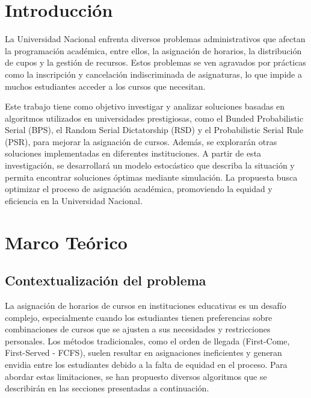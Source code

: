 \documentclass{article}
\begin{document}


\section{Introducción}\label{sec:intr}
La Universidad Nacional enfrenta diversos problemas administrativos que afectan la programación 
académica, entre ellos, la asignación de horarios, la distribución de cupos y la gestión de recursos.
 Estos problemas se ven agravados por prácticas como la inscripción y cancelación indiscriminada de 
 asignaturas, lo que impide a muchos estudiantes acceder a los cursos que necesitan.

Este trabajo tiene como objetivo investigar y analizar soluciones basadas en algoritmos utilizados
 en universidades prestigiosas, como el Bunded Probabilistic Serial (BPS), el Random Serial Dictatorship 
 (RSD) y el Probabilistic Serial Rule (PSR), para mejorar la asignación de cursos. 
 Además, se explorarán otras soluciones implementadas en diferentes instituciones. 
 A partir de esta investigación, se desarrollará un modelo estocástico que describa la situación y 
 permita encontrar soluciones óptimas mediante simulación. La propuesta busca optimizar el proceso 
 de asignación académica, promoviendo la equidad y eficiencia en la Universidad Nacional.


\section{Marco Teórico}\label{sec:marc}

\subsection{Contextualización del problema}

La asignación de horarios de cursos en instituciones educativas es un desafío complejo, especialmente cuando
 los estudiantes tienen preferencias sobre combinaciones de cursos que se ajusten a sus necesidades y 
 restricciones personales. Los métodos tradicionales, como el orden de llegada (First-Come, First-Served - FCFS),
  suelen resultar en asignaciones ineficientes y generan envidia entre los estudiantes debido a la falta de 
  equidad en el proceso. Para abordar estas limitaciones, se han propuesto diversos algoritmos que se describirán en las secciones presentadas a continuación.
\end{document}
